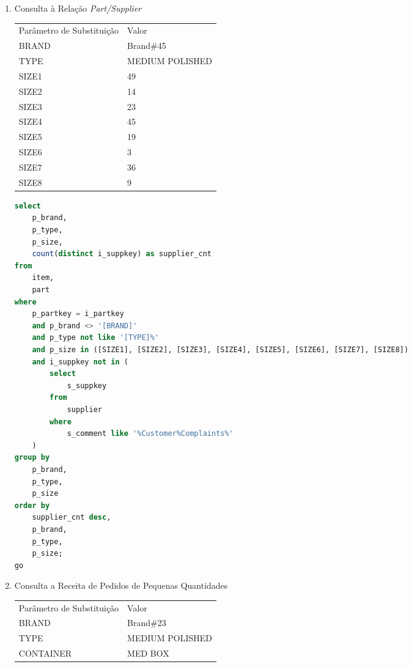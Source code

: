 \begin{enumerate}
\begin{lstlisting}[language=SQL]
select
	s_suppkey,
	s_name,
	s_address,
	s_phone,
	total_revenue
from
	supplier,
	revenue[STREAM_ID]
where
	s_suppkey = supplier_no
	and total_revenue = (
		select
			max(total_revenue)
		from
			revenue[STREAM_ID]
	)
order by
	s_suppkey;

drop view revenue[STREAM_ID];
	\end{lstlisting}

\item[Q16 --] Consulta à Relação \textit{Part/Supplier}

\begin{tabular}{ll}
	Parâmetro de Substituição & Valor\\
	BRAND & Brand$\#$45\\
	TYPE & MEDIUM POLISHED \\
	SIZE1 & 49 \\
	SIZE2 & 14 \\
	SIZE3 & 23 \\
	SIZE4 & 45 \\
	SIZE5 & 19 \\
	SIZE6 &  3 \\
	SIZE7 & 36 \\
	SIZE8 &  9 \\
\end{tabular}

	\begin{lstlisting}[language=SQL]
select
    p_brand,
    p_type,
    p_size,
    count(distinct i_suppkey) as supplier_cnt
from
	item,
    part
where
    p_partkey = i_partkey
    and p_brand <> '[BRAND]'
    and p_type not like '[TYPE]%'
    and p_size in ([SIZE1], [SIZE2], [SIZE3], [SIZE4], [SIZE5], [SIZE6], [SIZE7], [SIZE8])
    and i_suppkey not in (
        select
            s_suppkey
        from
            supplier
        where
            s_comment like '%Customer%Complaints%'
    )
group by
    p_brand,
    p_type,
    p_size
order by
    supplier_cnt desc,
    p_brand,
    p_type,
    p_size;
go
	\end{lstlisting}

\item[Q17 --] Consulta a Receita de Pedidos de Pequenas Quantidades

\begin{tabular}{ll}
	Parâmetro de Substituição & Valor\\
	BRAND & Brand$\#$23\\
	TYPE & MEDIUM POLISHED \\
	CONTAINER & MED BOX \\
\end{tabular}


\end{enumerate}
